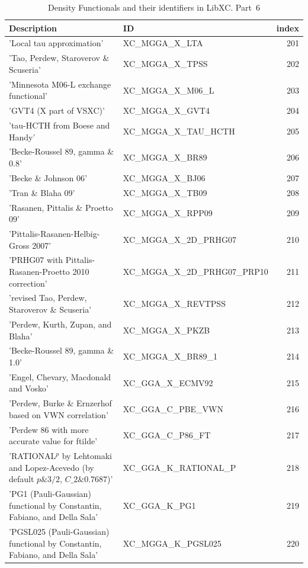 \documentclass[final,12pt,makeidx,DIV=calc]{article}
\begin{document}
{{{{{{\begin{table}[!h]
\caption{Density Functionals and their identifiers in LibXC. Part~6}
\begin{center}
\begin{tabular}{llr}
\hline
\hline
Description & ID & index\\
\hline
  'Local tau approximation' & XC\_MGGA\_X\_LTA  &201\\
  'Tao, Perdew, Staroverov \& Scuseria' & XC\_MGGA\_X\_TPSS  &202\\
  'Minnesota M06-L exchange functional' & XC\_MGGA\_X\_M06\_L  &203\\
  'GVT4 (X part of VSXC)' & XC\_MGGA\_X\_GVT4  &204\\
  'tau-HCTH from Boese and Handy' & XC\_MGGA\_X\_TAU\_HCTH  &205\\
  'Becke-Roussel 89, gamma \& 0.8' & XC\_MGGA\_X\_BR89  &206\\
  'Becke \& Johnson 06' & XC\_MGGA\_X\_BJ06  &207\\
  'Tran \& Blaha 09' & XC\_MGGA\_X\_TB09  &208\\
  'Rasanen, Pittalis \& Proetto 09' & XC\_MGGA\_X\_RPP09  &209\\
  'Pittalis-Rasanen-Helbig-Gross 2007' & XC\_MGGA\_X\_2D\_PRHG07  &210\\
  'PRHG07 with Pittalis-Rasanen-Proetto 2010 correction' & XC\_MGGA\_X\_2D\_PRHG07\_PRP10  &211\\
  'revised Tao, Perdew, Staroverov \& Scuseria' & XC\_MGGA\_X\_REVTPSS  &212\\
  'Perdew, Kurth, Zupan, and Blaha' & XC\_MGGA\_X\_PKZB  &213\\
  'Becke-Roussel 89, gamma \& 1.0' & XC\_MGGA\_X\_BR89\_1  &214\\
  'Engel, Chevary, Macdonald and Vosko' & XC\_GGA\_X\_ECMV92  &215\\
  'Perdew, Burke \& Ernzerhof based on VWN correlation' & XC\_GGA\_C\_PBE\_VWN  &216\\
  'Perdew 86 with more accurate value for ftilde' & XC\_GGA\_C\_P86\_FT  &217\\
  'RATIONAL$^{p}$ by Lehtomaki and Lopez-Acevedo (by default $p\&3/2$, $C\_{2}\&0.7687$)' & XC\_GGA\_K\_RATIONAL\_P  &218\\
  'PG1 (Pauli-Gaussian) functional by Constantin, Fabiano, and Della Sala' & XC\_GGA\_K\_PG1  &219\\
  'PGSL025 (Pauli-Gaussian) functional by Constantin, Fabiano, and Della Sala' & XC\_MGGA\_K\_PGSL025  &220\\

\end{tabular}
\end{center}
\end{table}}}}}}}
\end{document}
